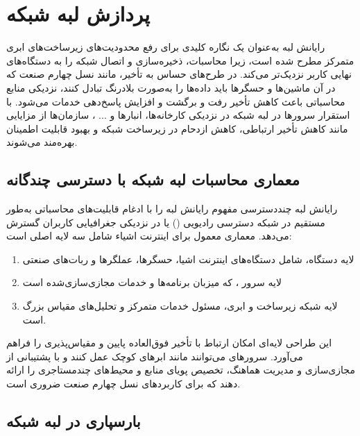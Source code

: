 \section{پردازش لبه شبکه}

رایانش لبه به‌عنوان یک نگاره کلیدی برای رفع محدودیت‌های زیرساخت‌های ابری متمرکز مطرح شده است، زیرا محاسبات، ذخیره‌سازی و اتصال شبکه را به دستگاه‌های نهایی کاربر نزدیک‌تر می‌کند. در طرح‌های حساس به تأخیر، مانند نسل چهارم صنعت که در آن ماشین‌ها و حسگرها باید داده‌ها را به‌صورت بلادرنگ تبادل کنند، نزدیکی منابع محاسباتی باعث کاهش تأخیر رفت و برگشت و افزایش پاسخ‌دهی خدمات می‌شود. با استقرار سرورها در لبه شبکه در نزدیکی کارخانه‌ها، انبارها و ... ، سازمان‌ها از مزایایی مانند کاهش تأخیر ارتباطی، کاهش ازدحام در زیرساخت شبکه و بهبود قابلیت اطمینان بهره‌مند می‌شوند.

\subsection{معماری محاسبات لبه شبکه با دسترسی چندگانه}

رایانش لبه چنددسترسی  مفهوم رایانش لبه را با ادغام قابلیت‌های محاسباتی به‌طور مستقیم در شبکه دسترسی رادیویی () یا در نزدیکی جغرافیایی کاربران گسترش می‌دهد. معماری معمول  برای اینترنت اشیاء شامل سه لایه اصلی است:

\begin{enumerate}
\item
لایه دستگاه، شامل دستگاه‌های اینترنت اشیا، حسگرها، عملگرها و ربات‌های صنعتی

\item
لایه سرور ، که میزبان برنامه‌ها و خدمات مجازی‌سازی‌شده است

\item
لایه شبکه زیرساخت و ابری، مسئول خدمات متمرکز و تحلیل‌های مقیاس بزرگ است. 
\end{enumerate}

این طراحی لایه‌ای امکان ارتباط با تأخیر فوق‌العاده پایین و مقیاس‌پذیری را فراهم می‌آورد. سرورهای  می‌توانند مانند ابرهای کوچک عمل کنند و با پشتیبانی از مجازی‌سازی و مدیریت هماهنگ، تخصیص پویای منابع و محیط‌های چندمستاجری را ارائه دهند که برای کاربردهای نسل چهارم صنعت ضروری است.

\subsection{بارسپاری در لبه شبکه}

